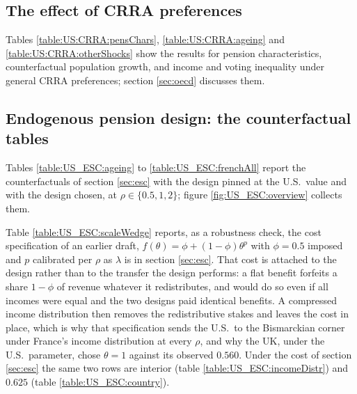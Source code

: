 



\subsection{The effect of CRRA preferences}\label{app:US:CRRA}

Tables \ref{table:US:CRRA:pensChars}, \ref{table:US:CRRA:ageing} and \ref{table:US:CRRA:otherShocks} show the results for pension characteristics, counterfactual population growth, and income and voting inequality under general CRRA preferences; section \ref{sec:oecd} discusses them.







\subsection{Endogenous pension design: the counterfactual tables}\label{app:US:escTables}

Tables \ref{table:US_ESC:ageing} to \ref{table:US_ESC:frenchAll} report the counterfactuals of section \ref{sec:esc} with the design pinned at the U.S.\ value and with the design chosen, at $\rho \in \{0.5, 1, 2\}$; figure \ref{fig:US_ESC:overview} collects them.









Table \ref{table:US_ESC:scaleWedge} reports, as a robustness check, the cost specification of an earlier draft, $f(\theta) = \phi + (1-\phi)\theta^{p}$ with $\phi = 0.5$ imposed and $p$ calibrated per $\rho$ as $\lambda$ is in section \ref{sec:esc}. That cost is attached to the design rather than to the transfer the design performs: a flat benefit forfeits a share $1-\phi$ of revenue whatever it redistributes, and would do so even if all incomes were equal and the two designs paid identical benefits. A compressed income distribution then removes the redistributive stakes and leaves the cost in place, which is why that specification sends the U.S.\ to the Bismarckian corner under France's income distribution at every $\rho$, and why the UK, under the U.S.\ parameter, chose $\theta = 1$ against its observed $0.560$. Under the cost of section \ref{sec:esc} the same two rows are interior (table \ref{table:US_ESC:incomeDistr}) and $0.625$ (table \ref{table:US_ESC:country}).

